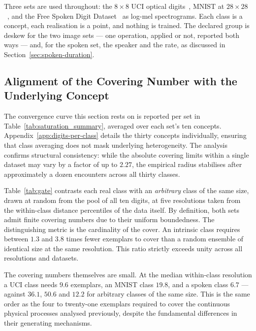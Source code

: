 \documentclass[10pt]{article}
\theoremstyle{plain}
\theoremstyle{definition}
\theoremstyle{remark}
\newcommand{\fitwidth}[1]{%
  \resizebox{\ifdim\width>\linewidth\linewidth\else\width\fi}{!}{#1}}
\begin{document}
Three sets are used throughout: the $8\times8$ UCI optical
digits~\citep{uci_optdigits}, MNIST at $28\times28$~\citep{lecun1998mnist}, and
the Free Spoken Digit Dataset~\citep{fsdd} as log-mel spectrograms. Each
class is a concept, each realisation is a point, and nothing is trained. The
declared group is deskew for the two image sets --- one operation, applied or
not, reported both ways --- and, for the spoken set, the speaker and the rate,
as discussed in Section~\ref{sec:spoken-duration}.

\subsection{Alignment of the Covering Number with the Underlying Concept}

The convergence curve this section rests on is reported per set in
Table~\ref{tab:saturation_summary}, averaged over each set's ten concepts.
Appendix~\ref{app:digits-per-class} details the thirty concepts individually,
ensuring that class averaging does not mask underlying heterogeneity. The
analysis confirms structural consistency: while the absolute covering limits
within a single dataset may vary by a factor of up to $2.27$, the empirical
radius stabilises after approximately a dozen encounters across all thirty
classes.


Table~\ref{tab:gate} contrasts each real class with an \emph{arbitrary} class
of the same size, drawn at random from the pool of all ten digits, at five
resolutions taken from the within-class distance percentiles of the data
itself. By definition, both sets admit finite covering numbers due to their
uniform boundedness. The distinguishing metric is the cardinality of the cover.
An intrinsic class requires between $1.3$ and $3.8$ times fewer exemplars to
cover than a random ensemble of identical size at the same resolution. This
ratio strictly exceeds unity across all resolutions and datasets.

The covering numbers themselves are small. At the median within-class
resolution a UCI class needs $9.6$ exemplars, an MNIST class $19.8$, and a
spoken class $6.7$ --- against $36.1$, $50.6$ and $12.2$ for arbitrary classes
of the same size. This is the same order as the four to twenty-one
exemplars required to cover the continuous physical processes analysed
previously, despite the fundamental differences in their generating mechanisms.

\begin{table}[!htbp]\centering\small
\fitwidth{}
\caption{\small The gate. $|S(\varepsilon)|$ for a real class and for an
arbitrary class of the same size, averaged over the ten classes and five
arrival orders, at five resolutions read off the within-class distance
distribution. The ratio is the signal: a concept is cheaper to cover than a
bag of the same size.}
\label{tab:gate}
\end{table}
\end{document}
